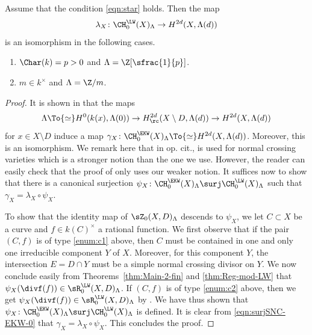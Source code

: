 \begin{thm}\label{thm:EKW-LW}
Assume that the condition \eqref{eqn:star} holds.
Then the map
\[
\lambda_X \colon \CH^{\LW}_0(X)_\Lambda \to H^{2d}(X, \Lambda(d))
\]
is an isomorphism in the following cases.
\begin{enumerate}
\item\label{thm:EKW-LW1}
$\Char(k) = p > 0$ and $\Lambda =
\Z[\sfrac{1}{p}]$.
\item\label{thm:EKW-LW2}
$m \in k^{\times}$ and $\Lambda = {\Z}/m$.
\end{enumerate}
\end{thm}
\begin{proof}
It is shown in \cite[Th.\,7.1]{EKW} that the maps
\begin{equation}\label{eqn:surjSNC-EKW-0}
\Lambda \To{\simeq} H^0(k(x), \Lambda(0)) \to
H^{2d}_\rc(X \setminus D, \Lambda(d)) \to H^{2d}(X, \Lambda(d))
\end{equation}
for $x \in X \setminus D$ induce a map
$\gamma_X \colon \CH^{\EKW}_0(X)_\Lambda \To{\simeq}
H^{2d}(X, \Lambda(d))$. Moreover, this is an isomorphism.
We remark here that in op. cit.,  is used for
normal crossing varieties which is a stronger notion than the one we use.
However, the reader can easily check that the proof of \cite[Th.\,7.1]{EKW}
only uses our weaker notion. It suffices now to show that
there is a canonical surjection $\psi_X\colon \CH^{\EKW}_0(X)_\Lambda \surj
\CH^{\LW}_0(X)_\Lambda$ such that $\gamma_X = \lambda_X \circ \psi_X$.

To show that the identity map of $\sZ_0(X, D)_\Lambda$ descends to $\psi_X$,
we let $C \subset X$ be a curve and $f \in k(C)^{\times}$ a rational function.
We first observe that if the pair $(C,f)$ is of type \eqref{enum:c1} above, then
$C$ must be contained in
one and only one irreducible component $Y$ of $X$. Moreover, for
this component $Y$, the intersection \hbox{$E = D \cap Y$} must be a simple normal
crossing divisor on $Y$. We now conclude easily from Theorems~\ref{thm:Main-2-fin}
and \ref{thm:Reg-mod-LW} that $\psi_{X}(\divf(f)) \in \sR^{\LW}_0(X,D)_\Lambda$.
If $(C,f)$ is of type \eqref{enum:c2} above, then we get
$\psi_X(\divf(f)) \in \sR^{\LW}_0(X,D)_\Lambda$
by . We have thus shown that $\psi_X \colon
\CH^{\EKW}_0(X)_\Lambda \surj \CH^{\LW}_0(X)_\Lambda$ is defined.
It is clear from \eqref{eqn:surjSNC-EKW-0} that
$\gamma_X = \lambda_X \circ \psi_X$.
This concludes the proof.
\end{proof}

